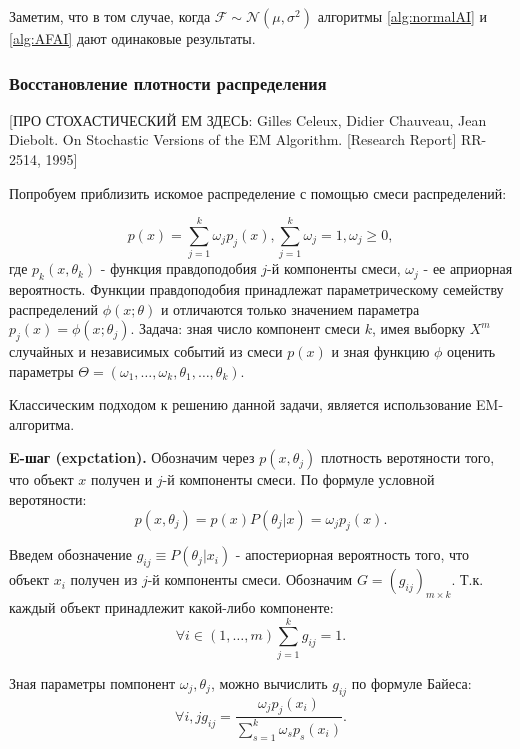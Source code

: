 \documentclass[12pt,a4paper]{report}
\begin{document}
Заметим, что в том случае, когда $\mathcal{F} \sim \mathcal{N}(\mu, \sigma^2)$ алгоритмы \ref{alg:normalAI} и \ref{alg:AFAI} дают одинаковые результаты.

\subsubsection{Восстановление плотности распределения}
[ПРО СТОХАСТИЧЕСКИЙ ЕМ ЗДЕСЬ: Gilles Celeux, Didier Chauveau, Jean Diebolt. On Stochastic Versions of the EM Algorithm. [Research Report] RR-2514, 1995]

Попробуем приблизить искомое распределение с помощью смеси распределений:

\begin{equation*}
p(x) = \sum_{j=1}^{k}\omega_jp_j(x), \sum_{j=1}^{k}\omega_j = 1, \omega_j \ge 0, 
\end{equation*}
где $p_k(x, \theta_k)$ - функция правдоподобия $j$-й компоненты смеси, $\omega_j$ - ее априорная вероятность. Функции правдоподобия принадлежат параметрическому семейству распределений $\phi(x; \theta)$ и отличаются только значением параметра $p_j(x) = \phi(x; \theta_j)$.
Задача: зная число компонент смеси $k$, имея выборку $X^m$ случайных и независимых событий из смеси $p(x)$ и зная функцию $\phi$ оценить параметры $\Theta = (\omega_1, \dots, \omega_k, \theta_1, \dots, \theta_k)$.

Классическим подходом к решению данной задачи, является использование EM-алгоритма.

\textbf{E-шаг (expctation).}
Обозначим через $p(x, \theta_j)$ плотность веротяности того, что объект $x$ получен и $j$-й компоненты смеси. По формуле условной веротяности:
\begin{equation*}
p(x, \theta_j) = p(x)P(\theta_j|x) = \omega_jp_j(x).
\end{equation*} 

Введем обозначение $g_{ij} \equiv P(\theta_j|x_i)$ - апостериорная вероятность того, что объект $x_i$ получен из $j$-й компоненты смеси. Обозначим $G=(g_{ij})_{m \times k}$. Т.к. каждый объект принадлежит какой-либо компоненте:
\begin{equation*}
\forall i \in (1, \dots, m) \sum_{j=1}^{k}g_{ij} = 1.
\end{equation*}

Зная параметры помпонент $\omega_j, \theta_j$, можно вычислить $g_{ij}$ по формуле Байеса:
\begin{equation*}
\forall i,j g_{ij} = \frac{\omega_jp_j(x_i)}{\sum_{s=1}^{k}\omega_sp_s(x_i)}.
\end{equation*}
\end{document}
